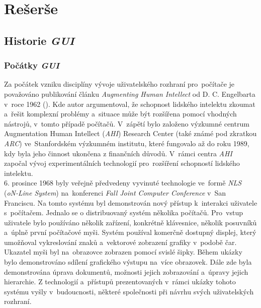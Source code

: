 \documentclass[11pt,twoside,a4paper]{book}
\begin{document}
\chapter{\label{CH:Rash}Rešerše}

\section{\label{SEC:history}Historie \textit{GUI}}
\subsection{Počátky \textit{GUI}}
Za počátek vzniku disciplíny vývoje uživatelského rozhraní pro~počítače je považováno publikování článku \textit{Augmenting Human Intellect} od D. C. Engelbarta v~roce 1962 (\cite{bib:AHI}). Kde autor argumentoval, že schopnost lidského intelektu zkoumat a~řešit komplexní problémy a~situace může být rozšířena pomocí vhodných nástrojů, v~tomto případě počítačů. V~zápětí bylo založeno výzkumné centrum Augmentation Human Intellect (\textit{AHI}) Research Center (také známé pod zkratkou \textit{ARC}) ve~Stanfordském výzkumném institutu, které fungovalo až do roku 1989, kdy byla jeho činnost ukončena z finančních důvodů. V~rámci centra \textit{AHI} započal vývoj experimentálních technologií pro~rozšíření schopností lidského intelektu.\\
6. prosince 1968 byly veřejně předvedeny vyvinuté technologie ve~formě \textit{NLS} (\textit{oN-Line System}) na~konferenci \textit{Fall Joint Computer Conference} v~San Franciscu. Na tomto systému byl demonstrován nový přístup k~interakci uživatele s~počítačem. Jednalo se o distribuovaný systém několika počítačů. Pro~vstup uživatele bylo používáno několik zařízení, konkrétně klávesnice, několik posuvníků a~úplně první počítačové myši. Systém používal komerčně dostupný displej, který umožňoval vykreslování znaků a~vektorové zobrazení grafiky v~podobě čar. Ukazatel myši byl na~obrazovce zobrazen pomocí svislé šipky. Během ukázky bylo demonstrováno sdílení grafického výstupu na~více obrazovek. Dále zde byla demonstrována úprava dokumentů, možnosti jejich zobrazování a~úpravy jejich hierarchie. Z technologií a~přístupů prezentovaných v~rámci ukázky tohoto systému vyšly v~budoucnosti, některé společnosti při návrhu svých uživatelských rozhraní.\cite{bib:aug}\\
\end{document}

